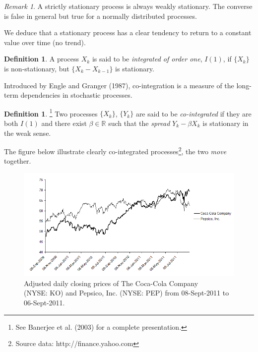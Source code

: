 \documentclass{article}
\theoremstyle{definition}
\newtheorem{definition}[thm]{Definition}
\theoremstyle{remark}
\newtheorem{remark}[thm]{Remark}
\newcommand{\measure}[1]{\ensuremath{\mathbb{#1}}}
\begin{document}
\begin{remark}
A strictly stationary process is always weakly stationary. The converse is false in general but true for a normally distributed processes.
\end{remark}

We deduce that a stationary process has a clear tendency to return to a constant value over time (no trend).

\begin{definition} A process ${X_k}$ is said to be \emph{integrated of order one}, $I(1)$, if $\{X_k\}$ is non-stationary, but $\{ X_k-X_{k-1}\}$ is stationary.
\end{definition}

Introduced by Engle and Granger (1987), co-integration is a measure of the long-term dependencies in stochastic processes. 

\begin{definition}\footnote{See Banerjee et al. (2003) for a complete presentation.} Two processes $\{X_k\}$, $\{Y_k\}$ are said to be \emph{co-integrated} if they are both $I(1)$ and there exist $\beta \in \measure{R}$ such that the \emph{spread} $Y_k-\beta X_k$ is stationary in the weak sense.
\end{definition}

The figure below illustrate clearly co-integrated processes\footnote{Source data: http://finance.yahoo.com}, the two \emph{move} together.

\begin{figure}[h!]
	\centering
	\includegraphics[width=.9\textwidth]{PepsiCoca.png}
	\caption{Adjusted daily closing prices of The Coca-Cola Company \\(NYSE: KO) and Pepsico, Inc. (NYSE: PEP) from 08-Sept-2011 to 06-Sept-2011.}
\end{figure}
\end{document}
